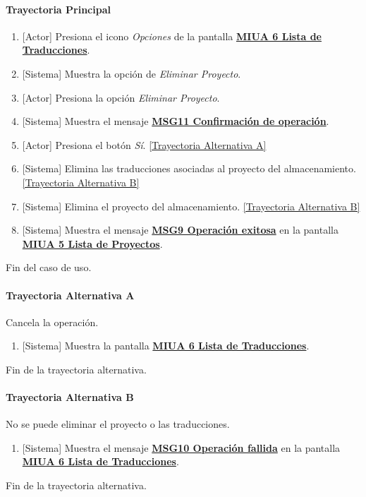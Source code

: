 \paragraph{Trayectoria Principal}
	\begin{enumerate}
	    \item {[Actor]} Presiona el icono \textit{Opciones} de la pantalla \hyperref[fig:MIUA-6]{\bf MIUA 6 Lista de Traducciones}.
	    \item {[Sistema]} Muestra la opción de \textit{Eliminar Proyecto}.
	    \item {[Actor]} Presiona la opción \textit{Eliminar Proyecto}.
	    \item {[Sistema]} Muestra el mensaje \hyperref[MSG11]{\bf MSG11 Confirmación de operación}.
	    \item {[Actor]} Presiona el botón \textit{Sí}. \hyperref[A-PR-CU1.1.3:TA]{[Trayectoria Alternativa A]}
	    \item {[Sistema]} Elimina las traducciones asociadas al proyecto del almacenamiento. \hyperref[A-PR-CU1.1.3:TB]{[Trayectoria Alternativa B]}
	    \item {[Sistema]} Elimina el proyecto del almacenamiento. \hyperref[A-PR-CU1.1.3:TB]{[Trayectoria Alternativa B]}
	    \item {[Sistema]} Muestra el mensaje \hyperref[MSG9]{\bf MSG9 Operación exitosa} en la pantalla \hyperref[fig:MIUA-5]{\bf MIUA 5 Lista de Proyectos}.
	\end{enumerate}
	Fin del caso de uso.

\paragraph{Trayectoria Alternativa A} \label{A-PR-CU1.1.3:TA}
	Cancela la operación.
	\begin{enumerate}[label=A\arabic*.]
		\item {[Sistema]} Muestra la pantalla \hyperref[fig:MIUA-6]{\bf MIUA 6 Lista de Traducciones}.
	\end{enumerate}
	Fin de la trayectoria alternativa.

\paragraph{Trayectoria Alternativa B} \label{A-PR-CU1.1.3:TB}
	No se puede eliminar el proyecto o las traducciones.
	\begin{enumerate}[label=B\arabic*.]
		\item {[Sistema]} Muestra el mensaje \hyperref[MSG10]{\bf MSG10 Operación fallida} en la pantalla \hyperref[fig:MIUA-6]{\bf MIUA 6 Lista de Traducciones}.
	\end{enumerate}
	Fin de la trayectoria alternativa.